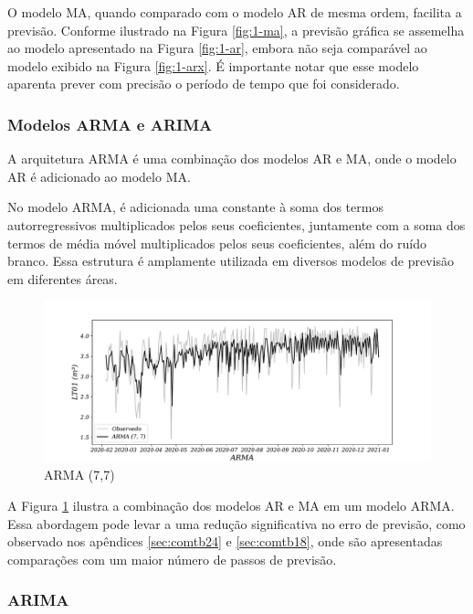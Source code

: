 O modelo MA, quando comparado com o modelo AR de mesma ordem, facilita a previsão. Conforme ilustrado na Figura \ref{fig:1-ma}, a previsão gráfica se assemelha ao modelo apresentado na Figura \ref{fig:1-ar}, embora não seja comparável ao modelo exibido na Figura \ref{fig:1-arx}. É importante notar que esse modelo aparenta prever com precisão o período de tempo que foi considerado.

\subsubsection{Modelos ARMA e ARIMA}\label{subsubsec:arma}
A arquitetura ARMA é uma combinação dos modelos AR  e MA, onde o modelo AR é adicionado ao modelo MA.

No modelo ARMA, é adicionada uma constante à soma dos termos autorregressivos multiplicados pelos seus coeficientes, juntamente com a soma dos termos de média móvel multiplicados pelos seus coeficientes, além do ruído branco. Essa estrutura é amplamente utilizada em diversos modelos de previsão em diferentes áreas.

\begin{figure}[H]
	\centering
	\caption{ARMA (7,7)}
	\label{fig:1-arma}
	\includegraphics[width=0.9\linewidth]{Modelos/Figuras/0-ARMA}
	
\end{figure}

A Figura \ref{fig:1-arma} ilustra a combinação dos modelos AR e MA em um modelo ARMA. Essa abordagem pode levar a uma redução significativa no erro de previsão, como observado nos apêndices \ref{sec:comtb24} e \ref{sec:comtb18}, onde são apresentadas comparações com um maior número de passos de previsão.

\subsubsection{ARIMA}

